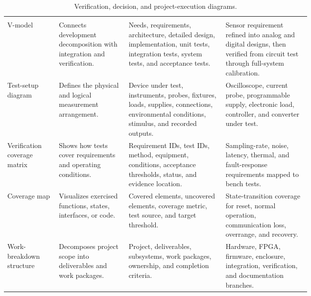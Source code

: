 \begin{singlespace}
\setlength{\LTcapwidth}{\linewidth}
\begin{longtable}{@{}L{0.17\linewidth} L{0.23\linewidth} L{0.32\linewidth} L{\tabcolsep\relax}@{}}
\caption{Verification, decision, and project-execution diagrams.}\label{tab:execution-diagrams}\\
 &  &  &  \\
\midrule
\endfirsthead
{}
 &  &  &  \\
\midrule
\endhead
\bottomrule
\endfoot
V-model & Connects development decomposition with integration and verification. & Needs, requirements, architecture, detailed design, implementation, unit tests, integration tests, system tests, and acceptance tests. & Sensor requirement refined into analog and digital designs, then verified from circuit test through full-system calibration. \\
\addlinespace[3pt]
Test-setup diagram & Defines the physical and logical measurement arrangement. & Device under test, instruments, probes, fixtures, loads, supplies, connections, environmental conditions, stimulus, and recorded outputs. & Oscilloscope, current probe, programmable supply, electronic load, controller, and converter under test. \\
\addlinespace[3pt]
Verification coverage matrix & Shows how tests cover requirements and operating conditions. & Requirement IDs, test IDs, method, equipment, conditions, acceptance thresholds, status, and evidence location. & Sampling-rate, noise, latency, thermal, and fault-response requirements mapped to bench tests. \\
\addlinespace[3pt]
Coverage map & Visualizes exercised functions, states, interfaces, or code. & Covered elements, uncovered elements, coverage metric, test source, and target threshold. & State-transition coverage for reset, normal operation, communication loss, overrange, and recovery. \\
\addlinespace[3pt]
Work-breakdown structure & Decomposes project scope into deliverables and work packages. & Project, deliverables, subsystems, work packages, ownership, and completion criteria. & Hardware, FPGA, firmware, enclosure, integration, verification, and documentation branches. \\

\end{longtable}
\end{singlespace}

